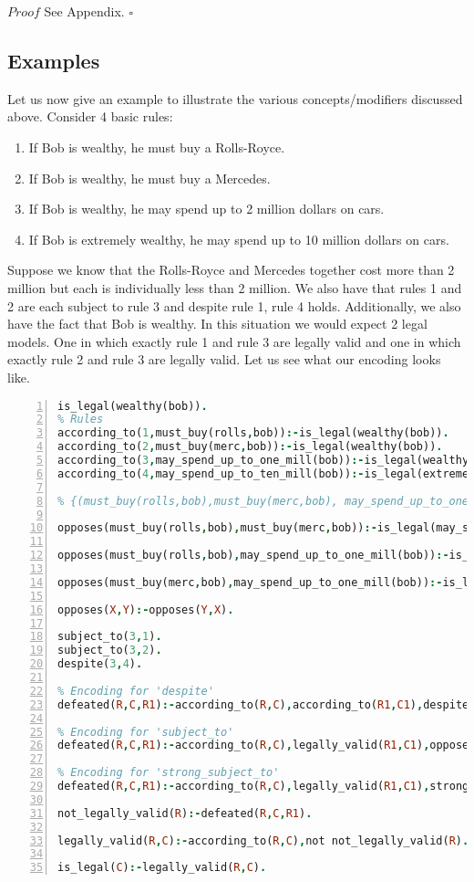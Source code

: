 $Proof$ See Appendix. $\square$
\subsection{Examples}
Let us now give an example to illustrate the various concepts/modifiers discussed above.
Consider 4 basic rules:
\begin{enumerate}
  \item If Bob is wealthy, he must buy a Rolls-Royce.
  \item If Bob is wealthy, he must buy a Mercedes.
  \item If Bob is wealthy, he may spend up to 2 million dollars on cars.
  \item If Bob is extremely wealthy, he may spend up to 10 million dollars on cars.
\end{enumerate}
Suppose we know that the Rolls-Royce and Mercedes together cost more
than 2 million but each is individually less than 2 million. We also
have that rules 1 and 2 are each subject to rule 3 and despite rule 1,
rule 4 holds. Additionally, we also have the fact that Bob is
wealthy. In this situation we would expect 2 legal models. One in which
exactly rule 1 and rule 3 are legally valid and one in which exactly
rule 2 and rule 3 are legally valid. Let us see what our encoding
looks like.
\begin{lstlisting}[language=Prolog, numbers=left]
is_legal(wealthy(bob)).
% Rules
according_to(1,must_buy(rolls,bob)):-is_legal(wealthy(bob)).
according_to(2,must_buy(merc,bob)):-is_legal(wealthy(bob)).
according_to(3,may_spend_up_to_one_mill(bob)):-is_legal(wealthy(bob)).
according_to(4,may_spend_up_to_ten_mill(bob)):-is_legal(extremely_wealthy(bob)).

% {(must_buy(rolls,bob),must_buy(merc,bob), may_spend_up_to_one_mill(bob)} is a min. inconsistent set.

opposes(must_buy(rolls,bob),must_buy(merc,bob)):-is_legal(may_spend_up_to_one_mill(bob)).

opposes(must_buy(rolls,bob),may_spend_up_to_one_mill(bob)):-is_legal(must_buy(merc,bob)).

opposes(must_buy(merc,bob),may_spend_up_to_one_mill(bob)):-is_legal(must_buy(rolls,bob)).

opposes(X,Y):-opposes(Y,X).

subject_to(3,1).
subject_to(3,2).
despite(3,4).

% Encoding for 'despite'
defeated(R,C,R1):-according_to(R,C),according_to(R1,C1),despite(R,R1).

% Encoding for 'subject_to'
defeated(R,C,R1):-according_to(R,C),legally_valid(R1,C1),opposes(C,C1),subject_to(R1,R).

% Encoding for 'strong_subject_to'
defeated(R,C,R1):-according_to(R,C),legally_valid(R1,C1),strong_subject_to(R1,R).

not_legally_valid(R):-defeated(R,C,R1).

legally_valid(R,C):-according_to(R,C),not not_legally_valid(R).

is_legal(C):-legally_valid(R,C).
\end{lstlisting}
